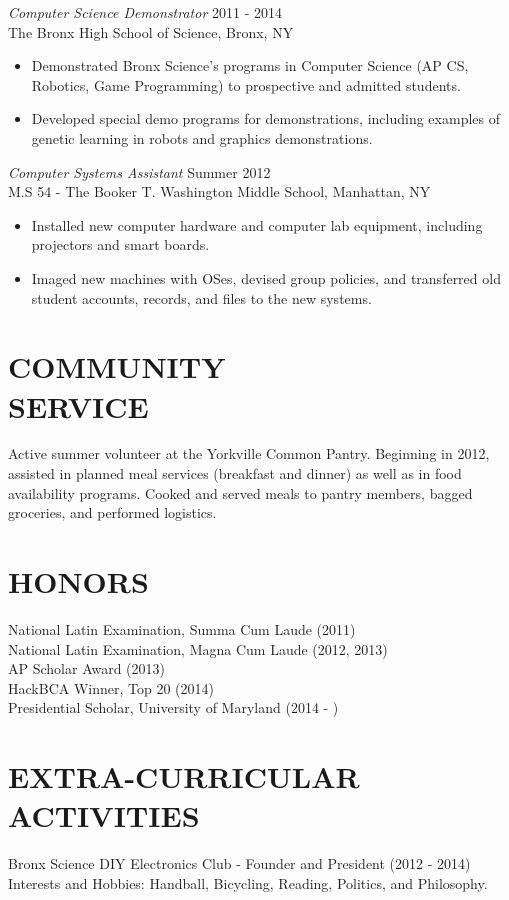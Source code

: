 \documentclass[margin]{res}
\begin{document}
\begin{resume}
                {\sl Computer Science Demonstrator} \hfill 2011 - 2014 \\
                The Bronx High School of Science, Bronx, NY
                 \begin{itemize}
                  \item Demonstrated Bronx Science's programs in Computer Science
                  		 (AP CS, Robotics, Game Programming) to prospective and admitted students.
                  \item Developed special demo programs for demonstrations, including 
                  		 examples of genetic learning in robots and graphics demonstrations.
                  \end{itemize} 

				{\sl Computer Systems Assistant} \hfill Summer 2012 \\
                M.S 54 - The Booker T. Washington Middle School,
                Manhattan, NY
                 \begin{itemize}  \itemsep -2pt
                 \item  Installed new computer hardware and computer lab equipment,
                 		including projectors and smart boards. 
                 \item	Imaged new machines with OSes, devised group policies, and transferred
                 		old student accounts, records, and files to the new systems.
                 \end{itemize}
                 
 
\section{COMMUNITY \\ SERVICE} Active summer volunteer at the Yorkville Common Pantry.
								Beginning in 2012, assisted in planned meal services 
								(breakfast and dinner) as well as in food availability 
								programs. Cooked and served meals to pantry members, 
								bagged groceries, and performed logistics.
								
\section{HONORS} National Latin Examination, Summa Cum Laude (2011) \\
				 National Latin Examination, Magna Cum Laude (2012, 2013) \\
				 AP Scholar Award (2013) \\
				 HackBCA Winner, Top 20 (2014) \\
				 Presidential Scholar, University of Maryland (2014 - ) \\

\section{EXTRA-CURRICULAR \\ ACTIVITIES}             
            Bronx Science DIY Electronics Club - Founder and President (2012 - 2014) \\
            Interests and Hobbies: Handball, Bicycling, Reading, Politics, and Philosophy.

\end{resume}
\end{document}
